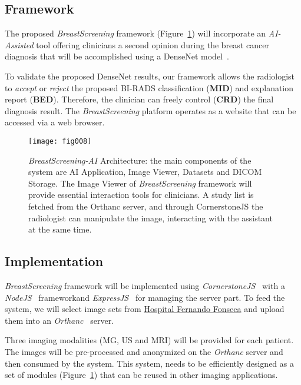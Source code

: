 \subsection{Framework}
\label{sec:sec00602}

The proposed {\it BreastScreening} framework (Figure~\ref{fig:fig008}) will incorporate an {\it AI-Assisted} tool offering clinicians a second opinion during the breast cancer diagnosis that will be accomplished using a DenseNet model~\cite{chen2019learning}.

To validate the proposed DenseNet results, our framework allows the radiologist to {\it accept} or {\it reject} the proposed BI-RADS classification ({\bf MID}) and explanation report ({\bf BED}).
Therefore, the clinician can freely control ({\bf CRD}) the final diagnosis result.
The {\it BreastScreening} platform operates as a website that can be accessed via a web browser.

\begin{figure}[htbp]
\centering
\texttt{[image: fig008]}
\caption{{\it BreastScreening-AI} Architecture: the main components of the system are AI Application, Image Viewer, Datasets and DICOM Storage. The Image Viewer of {\it BreastScreening} framework will provide essential interaction tools for clinicians. A study list is fetched from the Orthanc server, and through CornerstoneJS the radiologist can manipulate the image, interacting with the assistant at the same time.}
\label{fig:fig008}
\end{figure}

\subsection{Implementation}
\label{sec:sec00603}

{\it BreastScreening} framework will be implemented using {\it CornerstoneJS}\footnotemark[2]~\cite{urban2017lesiontracker} with a {\it NodeJS}~\cite{10.5555/3002437, drnasin2017javascript} framework\footnotemark[3] and {\it ExpressJS}\footnotemark[4]~\cite{10.1117/12.2285952} for managing the server part.
To feed the system, we will select image sets from \hyperlink{https://hff.min-saude.pt/}{Hospital Fernando Fonseca} and upload them into an {\it Orthanc}~\cite{Jodogne2018} server.

Three imaging modalities (MG, US and MRI) will be provided for each patient.
The images will be pre-processed and anonymized on the {\it Orthanc} server and then consumed by the system.
This system, needs to be efficiently designed as a set of modules (Figure~\ref{fig:fig008}) that can be reused in other imaging applications.

